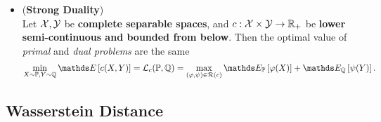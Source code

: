 \documentclass[11pt]{article}
\begin{document}
\begin{itemize}
\item \begin{proposition} (\textbf{Strong Duality})  \citep{santambrogio2015optimal}\\
Let ${\mathcal X}, {\mathcal Y}$ be \textbf{complete separable spaces}, and $c: {\mathcal X} \times {\mathcal Y} \to {\mathbb R}_{+}$ be \textbf{lower semi-continuous and bounded from below}. Then the optimal value of \emph{primal} and \emph{dual problems} are the same
\begin{align*}
\min_{X \sim \bP, Y \sim \bQ} \E{}{c(X, Y)} = \cL_{c}(\bP, \bQ) = \max_{(\varphi,  \psi) \in \cR(c)} \E{\bP}{\varphi(X)} + \E{\bQ}{\psi(Y)}.
\end{align*}
\end{proposition}
\end{itemize}
\subsection{Wasserstein Distance}
\end{document}
